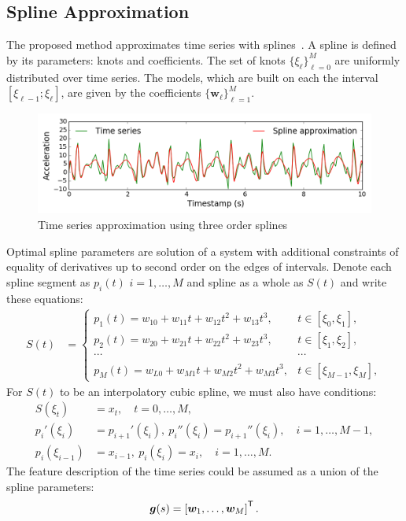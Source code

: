\subsection{Spline Approximation}
The proposed method approximates time series with splines~\cite{deboor1978splines}. A spline is defined by its parameters: knots and coefficients.
The set of knots $\{\xi_\ell\}_{\ell=0}^M$ are uniformly distributed over time series.
The models, which are built on each the interval $[\xi_{\ell-1}; \xi_{\ell}]$, are given by the coefficients $\{\mathbf{w}_\ell\}_{\ell=1}^{M}$.
\begin{figure}[h]
	\centering
	\includegraphics[width=1\linewidth]{pics/Fig2.png}
	\caption{Time series approximation using three order splines}
	\label{fig::spline_example}
\end{figure}
Optimal spline parameters are solution of a system with additional constraints of equality of derivatives up to second order on the edges of intervals. Denote each spline segment as $p_i(t)$ $i = 1, \dots, M$ and spline as a whole as $S(t)$ and write these equations:
\begin{align*}
S(t) &= \begin{cases}
p_1(t) = w_{10} +w_{11}t + w_{12}t^2 + w_{13}t^3, & t\in [\xi_0, \xi_1],\\
p_2(t) = w_{20} +w_{21}t + w_{22}t^2 + w_{23}t^3, & t\in [\xi_1, \xi_2],\\
\cdots&\cdots \\
p_{M}(t) = w_{L0} +w_{M1}t + w_{M2}t^2 + w_{M3}t^3, & t\in [\xi_{M-1}, \xi_M],					
\end{cases}
\end{align*}
For $S(t)$ to be an interpolatory cubic spline, we must also have conditions:
\begin{align*}
S(\xi_t) &= x_t, \quad t = 0, \dots, M,\\
p_i'(\xi_i) &= p_{i+1}'(\xi_i),\: p_i''(\xi_i) = p_{i+1}''(\xi_i), \quad i = 1, \dots, M-1,\\
p_i(\xi_{i-1}) &= x_{i-1},\: p_i(\xi_i) = x_i, \quad i = 1, \dots, M.
\end{align*}
The feature description of the time series could be assumed as a union of the spline parameters:
\[
\bm{g}(s) = \left[\bm{w}_1, \dots, \bm{w}_{M}\right]^{{\mbox{\scriptsize\sffamily\upshape\mdseries T}}}.
\]

